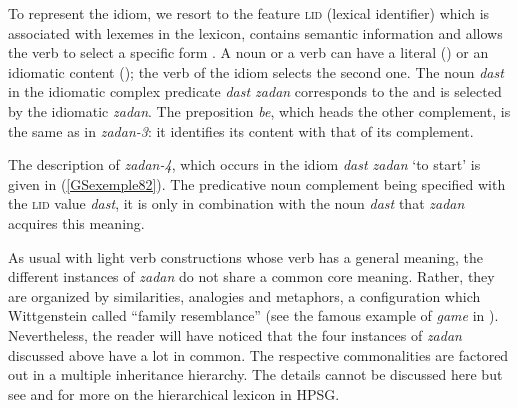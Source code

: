 \eal
	\label{GSexemple81} 
	\label{GSexemple81a}
		
    \label{GSexemple81b}
\zl

To represent the idiom, we resort to the feature \textsc{lid} (lexical identifier) which is
associated with lexemes in the lexicon, contains semantic information and allows the
  verb to select a specific form \parencites[410--411]{Sag2007a}[127-133]{Sag2012a}. A noun or a
  verb can have a literal () or an idiomatic content (); the verb of the
  idiom selects the second one. The noun \emph{dast} in the idiomatic complex predicate \emph{dast zadan}
  corresponds to the  and is selected by the idiomatic \emph{zadan}. The preposition
\emph{be}, which heads the other complement, is the same as in \emph{zadan-3}: it identifies its
content with that of its complement.

The description of \emph{zadan-4}, which occurs in the idiom \emph{dast zadan} `to start' is given in (\ref{GSexemple82}). The predicative noun complement being specified with the \textsc{lid} value \emph{dast}, it is only in combination with the noun \emph{dast} that \emph{zadan} acquires this meaning.


\ea
\label{GSexemple82}
\z

As usual with light verb constructions whose verb has a general meaning, the different instances of \emph{zadan} do not share a common core meaning. Rather, they are organized by similarities, analogies and metaphors, a configuration which Wittgenstein  called ``family resemblance'' (see the famous example of \emph{game} in \citealt[§66--67]{Wittgenstein2001a-u}). Nevertheless, the reader will have noticed that the four instances of \emph{zadan} discussed above have a lot in
common. The respective commonalities are factored out in a multiple inheritance hierarchy. The
details cannot be discussed here but see  and
 for more on the hierarchical lexicon in HPSG.

